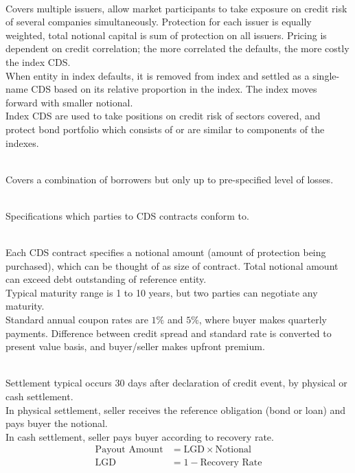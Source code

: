 \begin{definition} \\
Covers multiple issuers, allow market participants to take exposure on credit risk of several companies simultaneously. Protection for each issuer is equally weighted, total notional capital is sum of protection on all issuers. Pricing is dependent on credit correlation; the more correlated the defaults, the more costly the index CDS.\\
When entity in index defaults, it is removed from index and settled as a single-name CDS based on its relative proportion in the index. The index moves forward with smaller notional.\\
Index CDS are used to take positions on credit risk of sectors covered, and protect bond portfolio which consists of or are similar to components of the indexes.
\end{definition}

\begin{definition} \\
Covers a combination of borrowers but only up to pre-specified level of losses.
\end{definition}

\begin{remark} \\
Specifications which parties to CDS contracts conform to.
\end{remark}

\begin{remark} \\
Each CDS contract specifies a notional amount (amount of protection being purchased), which can be thought of as size of contract. Total notional amount can exceed debt outstanding of reference entity.\\
Typical maturity range is 1 to 10 years, but two parties can negotiate any maturity.\\
Standard annual coupon rates are $1\%$ and $5\%$, where buyer makes quarterly payments. Difference between credit spread and standard rate is converted to present value basis, and buyer/seller makes upfront premium.
\end{remark}

\begin{remark} \\
Settlement typical occurs 30 days after declaration of credit event, by physical or cash settlement.\\
In physical settlement, seller receives the reference obligation (bond or loan) and pays buyer the notional.\\
In cash settlement, seller pays buyer according to recovery rate.
\begin{align}
\text{Payout Amount} &= \text{LGD} \times \text{Notional} \nonumber \\
\text{LGD} &= 1 - \text{Recovery Rate} \nonumber
\end{align}
\end{remark}

